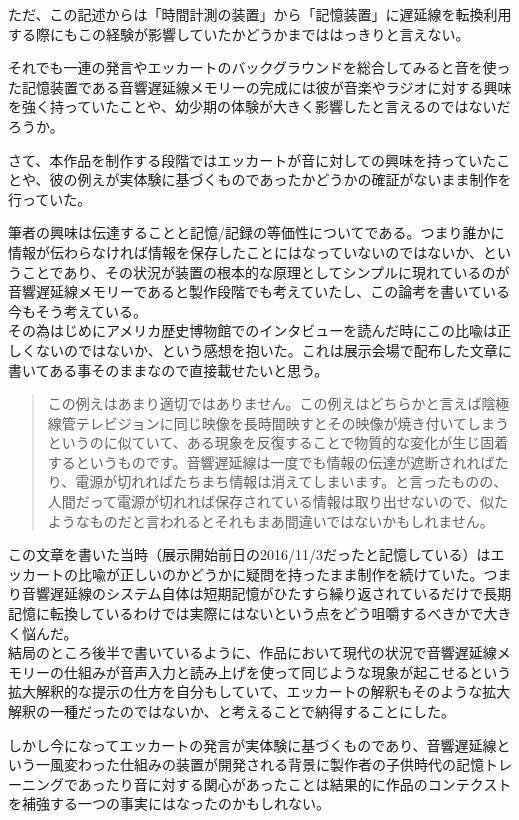 \documentclass[a4paper,report]{jsbook}
\begin{document}
ただ、この記述からは「時間計測の装置」から「記憶装置」に遅延線を転換利用する際にもこの経験が影響していたかどうかまでははっきりと言えない。

それでも一連の発言やエッカートのバックグラウンドを総合してみると音を使った記憶装置である音響遅延線メモリーの完成には彼が音楽やラジオに対する興味を強く持っていたことや、幼少期の体験が大きく影響したと言えるのではないだろうか。

さて、本作品を制作する段階ではエッカートが音に対しての興味を持っていたことや、彼の例えが実体験に基づくものであったかどうかの確証がないまま制作を行っていた。

筆者の興味は伝達することと記憶/記録の等価性についてである。つまり誰かに情報が伝わらなければ情報を保存したことにはなっていないのではないか、ということであり、その状況が装置の根本的な原理としてシンプルに現れているのが音響遅延線メモリーであると製作段階でも考えていたし、この論考を書いている今もそう考えている。\\
その為はじめにアメリカ歴史博物館でのインタビューを読んだ時にこの比喩は正しくないのではないか、という感想を抱いた。これは展示会場で配布した文章に書いてある事そのままなので直接載せたいと思う。

\begin{quote}
この例えはあまり適切ではありません。この例えはどちらかと言えば陰極線管テレビジョンに同じ映像を長時間映すとその映像が焼き付いてしまうというのに似ていて、ある現象を反復することで物質的な変化が生じ固着するというものです。音響遅延線は一度でも情報の伝達が遮断されればたり、電源が切れればたちまち情報は消えてしまいます。と言ったものの、人間だって電源が切れれば保存されている情報は取り出せないので、似たようなものだと言われるとそれもまあ間違いではないかもしれません。
\end{quote}

この文章を書いた当時（展示開始前日の2016/11/3だったと記憶している）はエッカートの比喩が正しいのかどうかに疑問を持ったまま制作を続けていた。つまり音響遅延線のシステム自体は短期記憶がひたすら繰り返されているだけで長期記憶に転換しているわけでは実際にはないという点をどう咀嚼するべきかで大きく悩んだ。\\
結局のところ後半で書いているように、作品において現代の状況で音響遅延線メモリーの仕組みが音声入力と読み上げを使って同じような現象が起こせるという拡大解釈的な提示の仕方を自分もしていて、エッカートの解釈もそのような拡大解釈の一種だったのではないか、と考えることで納得することにした。

しかし今になってエッカートの発言が実体験に基づくものであり、音響遅延線という一風変わった仕組みの装置が開発される背景に製作者の子供時代の記憶トレーニングであったり音に対する関心があったことは結果的に作品のコンテクストを補強する一つの事実にはなったのかもしれない。
\end{document}
